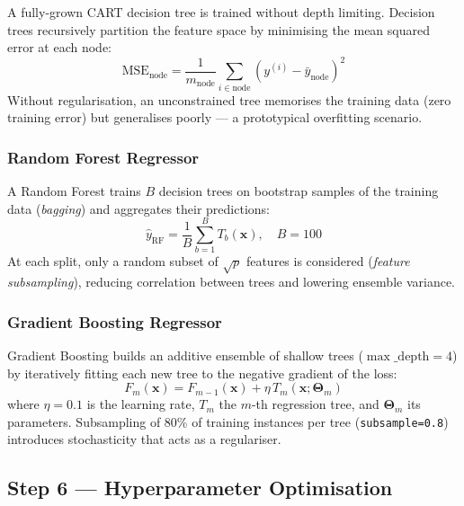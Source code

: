 \documentclass[conference]{IEEEtran}
\begin{document}
A fully-grown CART decision tree is trained without depth limiting. Decision trees recursively partition the feature space by minimising the mean squared error at each node:
\begin{equation}
    \text{MSE}_\text{node} = \frac{1}{m_\text{node}}\sum_{i \in \text{node}} \left(y^{(i)} - \bar{y}_\text{node}\right)^2
    \label{eq:tree_mse}
\end{equation}
Without regularisation, an unconstrained tree memorises the training data (zero training error) but generalises poorly — a prototypical overfitting scenario.

\subsubsection{Random Forest Regressor}

A Random Forest \cite{breiman2001random} trains $B$ decision trees on bootstrap samples of the training data (\emph{bagging}) and aggregates their predictions:
\begin{equation}
    \hat{y}_{\text{RF}} = \frac{1}{B}\sum_{b=1}^{B} T_b(\mathbf{x}), \quad B = 100
    \label{eq:rf}
\end{equation}
At each split, only a random subset of $\sqrt{p}$ features is considered (\emph{feature subsampling}), reducing correlation between trees and lowering ensemble variance.

\subsubsection{Gradient Boosting Regressor}

Gradient Boosting \cite{friedman2001greedy} builds an additive ensemble of shallow trees ($\max\_\text{depth} = 4$) by iteratively fitting each new tree to the negative gradient of the loss:
\begin{equation}
    F_m(\mathbf{x}) = F_{m-1}(\mathbf{x}) + \eta \, T_m(\mathbf{x}; \boldsymbol{\Theta}_m)
    \label{eq:gbm}
\end{equation}
where $\eta = 0.1$ is the learning rate, $T_m$ the $m$-th regression tree, and $\boldsymbol{\Theta}_m$ its parameters. Subsampling of 80\% of training instances per tree (\texttt{subsample=0.8}) introduces stochasticity that acts as a regulariser.

\subsection{Step 6 — Hyperparameter Optimisation}
\label{subsec:hpo}
\end{document}
